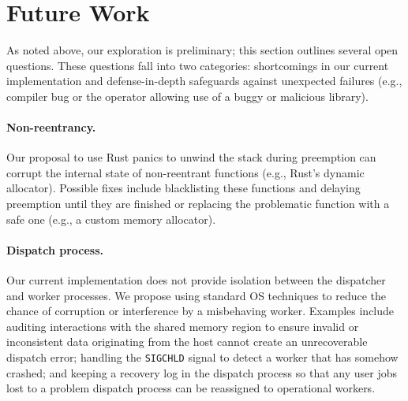 \section{Future Work}
\label{sec:future}

As noted above, our exploration is preliminary; this section outlines several
open questions.  These questions fall into two categories: shortcomings in our
current implementation and defense-in-depth safeguards against unexpected
failures (e.g., compiler bug or the operator allowing use of a buggy or malicious library).


\paragraph{Non-reentrancy.}
Our proposal to use Rust panics to unwind the stack during preemption can
corrupt the internal state of non-reentrant functions (e.g., Rust's dynamic
allocator).  Possible fixes include blacklisting these functions and delaying
preemption until they are finished or replacing the problematic function with a
safe one (e.g., a custom memory allocator).

\paragraph{Dispatch process.}
Our current implementation does not provide isolation between the dispatcher
and worker processes.  We propose using standard OS techniques to reduce
the chance of corruption or interference by a misbehaving worker.  Examples
include auditing interactions with the shared memory region to ensure invalid
or inconsistent data originating from the host cannot create an unrecoverable
dispatch error; handling the \texttt{SIGCHLD} signal to detect a worker that has
somehow crashed; and keeping a recovery log in the dispatch process so that any
user jobs lost to a problem dispatch process can be reassigned to operational
workers.

